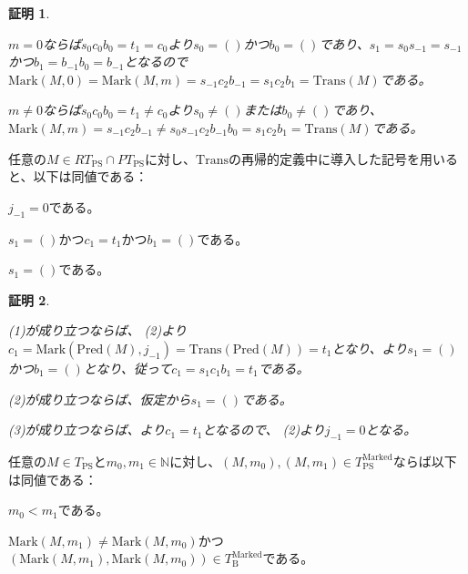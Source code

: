 \documentclass[dvipdfmx,uplatex]{jsarticle}
\theoremstyle{customnonumberbreakfortheorem}
\theoremstyle{customnonumberbreakforproof}
\newtheorem{hideableproof}{証明}
\begin{document}
\begin{hideableproof}
\begin{indented}
\begin{indented}
\begin{indented}
				\item \(m = 0\)ならば\(s_0 c_0 b_0 = t_1 = c_0\)より\(s_0 = ()\)かつ\(b_0 = ()\)であり、\(s_1 = s_0 s_{-1} = s_{-1}\)かつ\(b_1 = b_{-1} b_0 = b_{-1}\)となるので\(\textrm{Mark}(M,0) = \textrm{Mark}(M,m) = s_{-1} c_2 b_{-1} = s_1 c_2 b_1 = \textrm{Trans}(M)\)である。
				\item \(m \neq 0\)ならば\(s_0 c_0 b_0 = t_1 \neq c_0\)より\(s_0 \neq ()\)または\(b_0 \neq ()\)であり、\(\textrm{Mark}(M,m) = s_{-1} c_2 b_{-1} \neq s_0 s_{-1} c_2 b_{-1} b_0 = s_1 c_2 b_1 = \textrm{Trans}(M)\)である。
			\end{indented}
		\end{indented}
	\end{indented}
\end{hideableproof}

\begin{corollary}[\(s_1\)と\(b_1\)の空性と基点の関係]\label{s_1とb_1の空性と基点の関係}
	任意の\(M \in RT_{\textrm{PS}} \cap PT_{\textrm{PS}}\)に対し、\(\textrm{Trans}\)の再帰的定義中に導入した記号を用いると、以下は同値である：
	\begin{penumerate}
		\item \(j_{-1} = 0\)である。
		\item \(s_1 = ()\)かつ\(c_1 = t_1\)かつ\(b_1 = ()\)である。
		\item \(s_1 = ()\)である。
	\end{penumerate}
\end{corollary}

\begin{hideableproof}
	\begin{indented}
		\item (1)が成り立つならば、 (2)より\(c_1 = \textrm{Mark}(\textrm{Pred}(M),j_{-1}) = \textrm{Trans}(\textrm{Pred}(M)) = t_1\)となり、より\(s_1 = ()\)かつ\(b_1 = ()\)となり、従って\(c_1 = s_1 c_1 b_1 = t_1\)である。
		\item (2)が成り立つならば、仮定から\(s_1 = ()\)である。
		\item (3)が成り立つならば、より\(c_1 = t_1\)となるので、 (2)より\(j_{-1} = 0\)となる。
	\end{indented}
\end{hideableproof}

\begin{proposition}\label{Markが順序関係を保つこと}
	任意の\(M \in T_{\textrm{PS}}\)と\(m_0,m_1 \in \mathbb{N}\)に対し、\((M,m_0), (M,m_1) \in T_{\textrm{PS}}^{\textrm{Marked}}\)ならば以下は同値である：
	\begin{penumerate}
		\item \(m_0 < m_1\)である。
		\item \(\textrm{Mark}(M,m_1) \neq \textrm{Mark}(M,m_0)\)かつ\((\textrm{Mark}(M,m_1),\textrm{Mark}(M,m_0)) \in T_{\textrm{B}}^{\textrm{Marked}}\)である。
	\end{penumerate}
\end{proposition}
\end{document}
